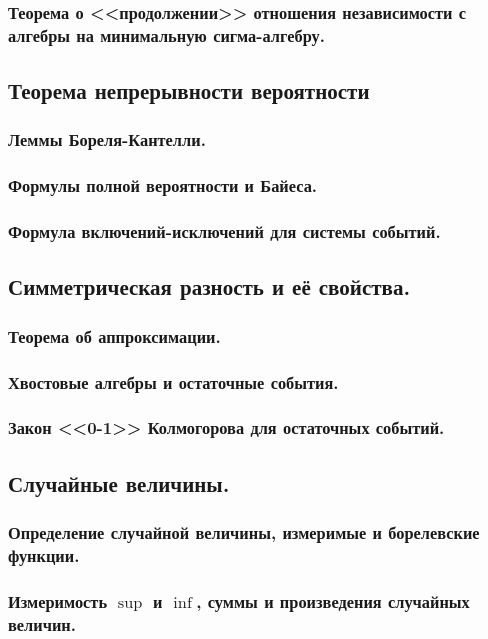 \subsubsection{Теорема о <<продолжении>> отношения независимости с алгебры на минимальную сигма-алгебру.}
\subsection{Теорема непрерывности вероятности}
\subsubsection{Леммы Бореля-Кантелли.}
\subsubsection{Формулы полной вероятности и Байеса.}
\subsubsection{Формула включений-исключений для системы событий.}
\subsection{Симметрическая разность и её свойства.}
\subsubsection{Теорема об аппроксимации.}
\subsubsection{Хвостовые алгебры и остаточные события.}
\subsubsection{Закон <<0-1>> Колмогорова для остаточных событий.}
\subsection{Случайные величины.}
\subsubsection{Определение случайной величины, измеримые и борелевские функции.}
\subsubsection{Измеримость $\sup$ и $\inf$, суммы и произведения случайных величин.}
